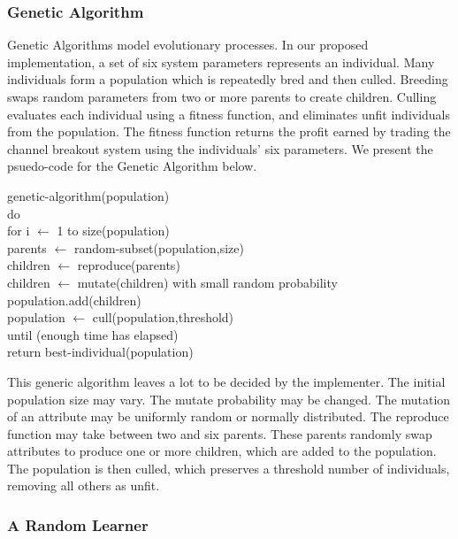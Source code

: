 \documentclass[10pt]{article}
\begin{document}
\subsubsection{Genetic Algorithm}
Genetic Algorithms model evolutionary processes.  In our proposed
implementation, a set of six system parameters represents an individual.  Many
individuals form a population which is repeatedly bred and then culled.
Breeding swaps random parameters from two or more parents to create children.
Culling evaluates each individual using a fitness function, and eliminates unfit
individuals from the population.  The fitness function returns the profit earned
by trading the channel breakout system using the individuals' six parameters.
We present the psuedo-code for the Genetic Algorithm below.

\setlength{\parindent}{5mm}
\indent genetic-algorithm(population)\\
\indent \indent do\\
\indent \indent \indent for i $\leftarrow$ 1 to size(population)\\
\indent \indent \indent \indent parents $\leftarrow$ random-subset(population,size)\\
\indent \indent \indent \indent children $\leftarrow$ reproduce(parents)\\
\indent \indent \indent \indent children $\leftarrow$ mutate(children) with small random probability\\
\indent \indent \indent \indent population.add(children)\\
\indent \indent \indent population $\leftarrow$ cull(population,threshold)\\
\indent \indent until (enough time has elapsed)\\
\indent \indent return best-individual(population)\\
\setlength{\parindent}{0mm}

This generic algorithm leaves a lot to be decided by the implementer.
The initial population size may vary.  The mutate probability may be changed.
The mutation of an attribute may be uniformly random or normally distributed.
The reproduce function may take between two and six parents.  These parents
randomly swap attributes to produce one or more children, which are added to the
population.  The population is then culled, which preserves a threshold
number of individuals, removing all others as unfit.

\subsubsection{A Random Learner}
\end{document}
